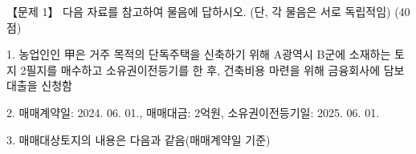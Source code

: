 \begin{longquestion}{【문제 1】}
다음 자료를 참고하여 물음에 답하시오. (단, 각 물음은 서로 독립적임) (40점) \par
\begin{framedtext}
1. 농업인인 甲은 거주 목적의 단독주택을 신축하기 위해 A광역시 B군에 소재하는 토지 2필지를 매수하고 소유권이전등기를 한 후, 건축비용 마련을 위해 금융회사에 담보대출을 신청함 \par
2. 매매계약일: 2024. 06. 01., 매매대금: 2억원, 소유권이전등기일: 2025. 06. 01. \par
3. 매매대상토지의 내용은 다음과 같음(매매계약일 기준) \par
{\small\centering
{}\par}


\end{framedtext}
\end{longquestion}
